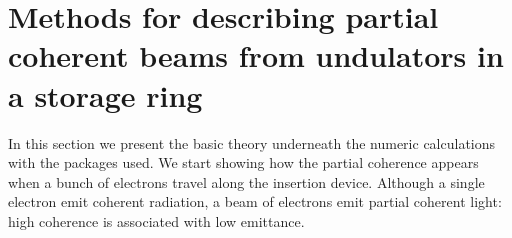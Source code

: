 \documentclass{iucr}              %
\begin{document}

\section{Methods for describing partial coherent beams from undulators in a storage ring}\label{sec:part_coh}
 \newline

In this section we present the basic theory underneath the numeric calculations with the packages used. We start showing how the partial coherence appears when a bunch of electrons travel along the insertion device. Although a single electron emit coherent radiation, a beam of electrons emit partial coherent light: high coherence is associated with low emittance. 

\end{document}
